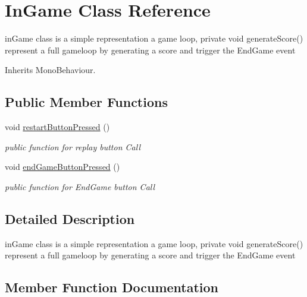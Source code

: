 \hypertarget{class_in_game}{}\section{In\+Game Class Reference}
\label{class_in_game}


in\+Game class is a simple representation a game loop, private void generate\+Score() represent a full gameloop by generating a score and trigger the End\+Game event  




Inherits Mono\+Behaviour.

\subsection*{Public Member Functions}
\begin{DoxyCompactItemize}
\item 
void \mbox{\hyperlink{class_in_game_a7c46fc262a084ee729b39c5883aa29cc}{restart\+Button\+Pressed}} ()
\begin{DoxyCompactList}\small\item\em public function for replay button Call \end{DoxyCompactList}\item 
void \mbox{\hyperlink{class_in_game_a6dfd5da456b807ee78132094aef77871}{end\+Game\+Button\+Pressed}} ()
\begin{DoxyCompactList}\small\item\em public function for End\+Game button Call \end{DoxyCompactList}\end{DoxyCompactItemize}


\subsection{Detailed Description}
in\+Game class is a simple representation a game loop, private void generate\+Score() represent a full gameloop by generating a score and trigger the End\+Game event 

\subsection{Member Function Documentation}
\mbox{\label{class_in_game_a6dfd5da456b807ee78132094aef77871}} 
